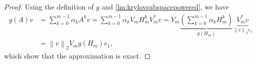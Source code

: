 \begin{proof}
    Using the definition of $g$ and \ref{lm:krylovsubspacepowered}, we have
    \begin{equation*}
        \begin{aligned}
            g(A) v & = \sum_{k=0}^{m-1}{\alpha_k A^k v}
            = \sum_{k=0}^{m-1}{\alpha_k V_m H_m^k V_m^* v}
            = V_m \underset{g(H_m)}{\underbrace{\left( \sum_{k=0}^{m-1}{\alpha_k H_m^k } \right)}}
            \underset{\left\| v \right\|_2 e_1}{\underbrace{V_m^* v}}\\
            & = \left\| v \right\|_2 V_m g(H_m) e_1,
        \end{aligned}
    \end{equation*}
    which show that the approximation is exact.
\end{proof}

